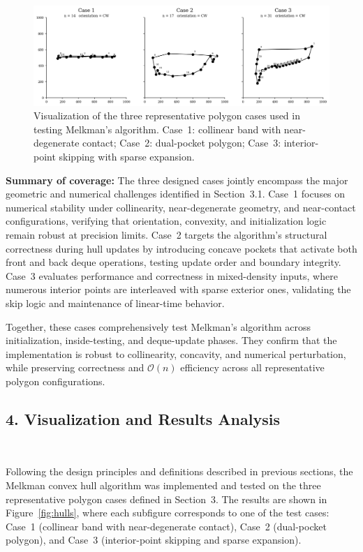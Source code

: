 \documentclass{article}
\begin{document}
\begin{figure}[H]
    \centering
    \includegraphics[width=0.9\linewidth]{Pictures/polygon_cases.png}
    \caption{Visualization of the three representative polygon cases used in testing Melkman’s algorithm. 
    Case~1: collinear band with near-degenerate contact; 
    Case~2: dual-pocket polygon; 
    Case~3: interior-point skipping with sparse expansion.}
\end{figure}

\textbf{Summary of coverage:}
The three designed cases jointly encompass the major geometric and numerical challenges identified in Section~3.1. 
Case~1 focuses on numerical stability under collinearity, near-degenerate geometry, and near-contact configurations, verifying that orientation, convexity, and initialization logic remain robust at precision limits. 
Case~2 targets the algorithm’s structural correctness during hull updates by introducing concave pockets that activate both front and back deque operations, testing update order and boundary integrity. 
Case~3 evaluates performance and correctness in mixed-density inputs, where numerous interior points are interleaved with sparse exterior ones, validating the skip logic and maintenance of linear-time behavior.

Together, these cases comprehensively test Melkman’s algorithm across initialization, inside-testing, and deque-update phases. 
They confirm that the implementation is robust to collinearity, concavity, and numerical perturbation, while preserving correctness and $\mathcal{O}(n)$ efficiency across all representative polygon configurations.

\subsection*{4. Visualization and Results Analysis}\

Following the design principles and definitions described in previous sections, the Melkman convex hull algorithm was implemented and tested on the three representative polygon cases defined in Section~3. 
The results are shown in Figure~\ref{fig:hulls}, where each subfigure corresponds to one of the test cases: 
Case~1 (collinear band with near-degenerate contact), 
Case~2 (dual-pocket polygon), 
and Case~3 (interior-point skipping and sparse expansion).
\end{document}
